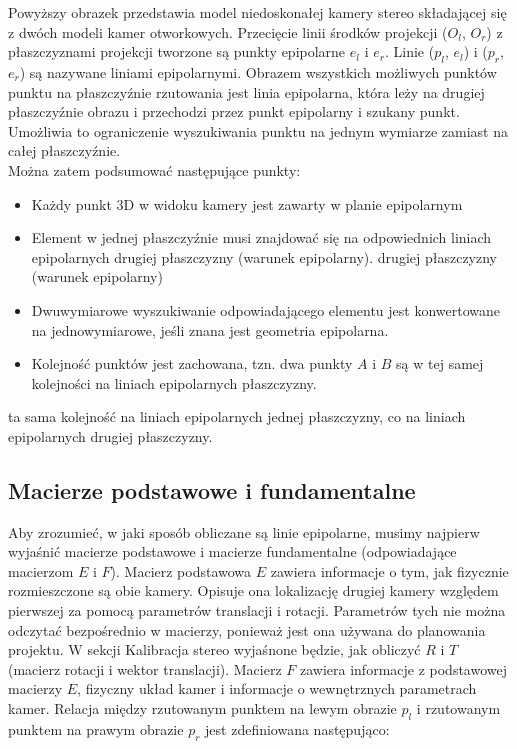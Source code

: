 \documentclass[magisterska]{pracadypl}
\begin{document}
Powyższy obrazek przedstawia model niedoskonałej kamery stereo składającej się z dwóch modeli kamer otworkowych.
Przecięcie linii środków projekcji ($O_l$, $O_r$) z płaszczyznami projekcji tworzone są punkty epipolarne $e_l$ i $e_r$. Linie ($p_l$, $e_l$) i ($p_r$, $e_r$) są nazywane liniami epipolarnymi. Obrazem wszystkich możliwych punktów punktu
na płaszczyźnie rzutowania jest linia epipolarna, która leży na drugiej płaszczyźnie obrazu i
przechodzi przez punkt epipolarny i szukany punkt. Umożliwia to ograniczenie wyszukiwania punktu na jednym wymiarze zamiast na całej płaszczyźnie.\\
Można zatem podsumować następujące punkty:

\begin{itemize}
  \item Każdy punkt 3D w widoku kamery jest zawarty w planie epipolarnym
  \item Element w jednej płaszczyźnie musi znajdować się na odpowiednich liniach epipolarnych drugiej płaszczyzny (warunek epipolarny).
drugiej płaszczyzny (warunek epipolarny)
  \item Dwuwymiarowe wyszukiwanie odpowiadającego elementu jest konwertowane na
jednowymiarowe, jeśli znana jest geometria epipolarna.
  \item Kolejność punktów jest zachowana, tzn. dwa punkty $A$ i $B$ są w tej samej kolejności na liniach epipolarnych płaszczyzny.

\end{itemize}

ta sama kolejność na liniach epipolarnych jednej płaszczyzny, co na liniach epipolarnych drugiej płaszczyzny.

\subsection{Macierze podstawowe i fundamentalne}

Aby zrozumieć, w jaki sposób obliczane są linie epipolarne, musimy najpierw wyjaśnić macierze podstawowe
i macierze fundamentalne (odpowiadające macierzom $E$ i $F$).
Macierz podstawowa $E$ zawiera informacje o tym, jak fizycznie rozmieszczone są obie kamery.
Opisuje ona lokalizację drugiej kamery względem pierwszej za pomocą parametrów translacji i rotacji.
Parametrów tych nie można odczytać bezpośrednio w macierzy, ponieważ jest ona używana do planowania projektu. W sekcji Kalibracja stereo wyjaśnone będzie, jak obliczyć $R$ i $T$ (macierz rotacji i wektor translacji).
Macierz $F$ zawiera informacje z podstawowej macierzy $E$, fizyczny układ kamer i informacje o wewnętrznych parametrach kamer.
Relacja między rzutowanym punktem na lewym obrazie $p_l$ i rzutowanym punktem na prawym obrazie $p_r$ jest zdefiniowana następująco:
\end{document}
